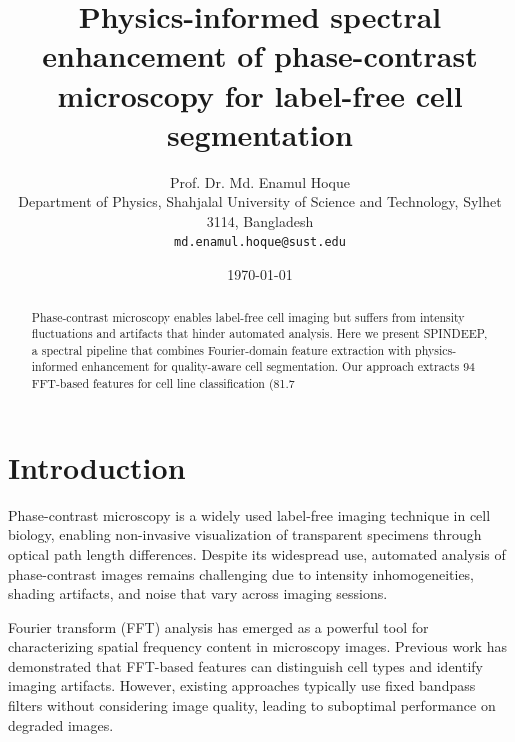 \documentclass[10pt,twocolumn]{article}
\title{Physics-informed spectral enhancement of phase-contrast microscopy for label-free cell segmentation}
\author{Prof. Dr. Md. Enamul Hoque \\ 
Department of Physics, Shahjalal University of Science and Technology, Sylhet 3114, Bangladesh \\ 
\texttt{md.enamul.hoque@sust.edu}}
\date{\today}
\begin{document}
\maketitle

\begin{abstract}
Phase-contrast microscopy enables label-free cell imaging but suffers from intensity fluctuations and artifacts that hinder automated analysis. Here we present SPINDEEP, a spectral pipeline that combines Fourier-domain feature extraction with physics-informed enhancement for quality-aware cell segmentation. Our approach extracts 94 FFT-based features for cell line classification (81.7%
\end{abstract}


\section{Introduction}

Phase-contrast microscopy is a widely used label-free imaging technique in cell biology, enabling non-invasive visualization of transparent specimens through optical path length differences\cite{Zernike1942}. Despite its widespread use, automated analysis of phase-contrast images remains challenging due to intensity inhomogeneities, shading artifacts, and noise that vary across imaging sessions\cite{Wahlby2012,Meijering2016}.

Fourier transform (FFT) analysis has emerged as a powerful tool for characterizing spatial frequency content in microscopy images\cite{Bartels2010,Chenou2014}. Previous work has demonstrated that FFT-based features can distinguish cell types and identify imaging artifacts\cite{Cong2017,Schneider2019}. However, existing approaches typically use fixed bandpass filters without considering image quality, leading to suboptimal performance on degraded images\cite{Vale2007}.
\end{document}
